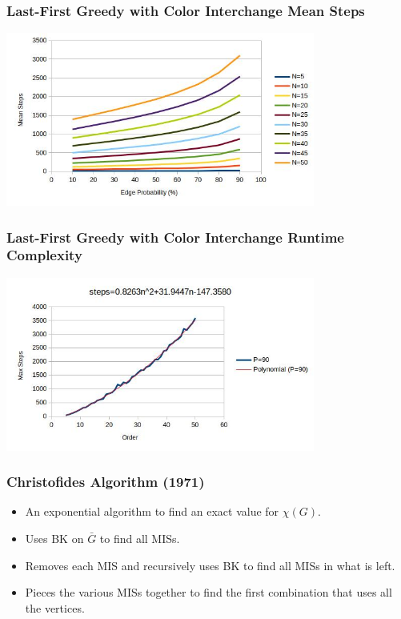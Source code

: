 \documentclass{beamer}
\newcommand{\X}{\chi}
\begin{document}
\begin{frame}
  \frametitle{Last-First Greedy with Color Interchange Mean Steps}
  \begin{center}
    \includegraphics[width=4in]{../final/greedyint_steps}
  \end{center}
\end{frame}

\begin{frame}
  \frametitle{Last-First Greedy with Color Interchange Runtime Complexity}
  \begin{center}
    \includegraphics[width=4in]{../final/greedyint_runtime}
  \end{center}
\end{frame}

\begin{frame}
  \frametitle{Christofides Algorithm (1971)}
  \begin{itemize}
  \item An exponential algorithm to find an exact value for \(\X(G)\).
  \item Uses BK on \(\bar{G}\) to find all MISs.
  \item Removes each MIS and recursively uses BK to find all MISs in what is left.
  \item Pieces the various MISs together to find the first combination that uses all the vertices.
  \end{itemize}
\end{frame}
\end{document}
